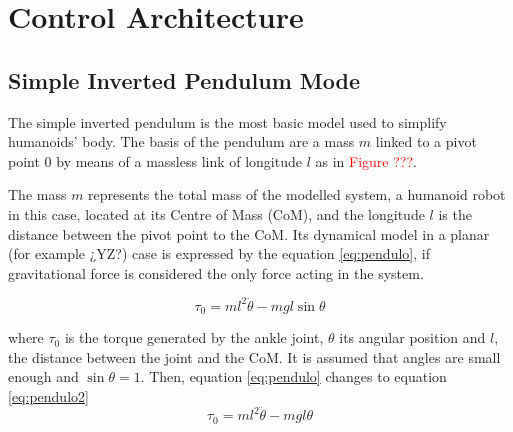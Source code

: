 \chapter{Control Architecture}
\section{Simple Inverted Pendulum Mode}
The simple inverted pendulum is the most basic model used to simplify humanoids' body. The basis of the pendulum are a mass $m$ linked to a pivot point $0$ by means of a massless link of longitude $l$ as in \textcolor{red}{Figure ???}.

The mass $m$ represents the total mass of the modelled system, a humanoid robot in this case, located at its Centre of Mass (CoM), and the longitude $l$ is the distance between the pivot point to the CoM. Its dynamical model in a planar (for example ¿YZ?) case is expressed by the equation \ref{eq:pendulo}, if gravitational force is considered the only force acting in the system.

\begin{equation}
\tau_0 = ml^2 \ddot{\theta} - mgl\sin\theta
\label{eq:pendulo}
\end{equation}

where $\tau_0$ is the torque generated by the ankle joint, $\theta$ its angular position and $l$, the distance between the joint and the CoM. It is assumed that angles are small enough and $\sin\theta = 1$. Then, equation \ref{eq:pendulo} changes to equation \ref{eq:pendulo2}
\begin{equation}
\tau_0 = ml^2 \ddot{\theta} - mgl\theta
\label{eq:pendulo2}
\end{equation}

